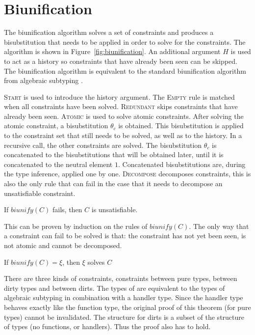 \section{Biunification}
The biunification algorithm solves a set of constraints and produces a bisubstitution that needs to be applied in order to solve for the constraints. The algorithm is shown in Figure~\ref{fig:biunification}. An additional argument $H$ is used to act as a history so constraints that have already been seen can be skipped. The biunification algorithm is equivalent to the standard biunification algorithm from algebraic subtyping \cite{dolan2017algebraic}.

\textsc{Start} is used to introduce the history argument. The \textsc{Empty} rule is matched when all constraints have been solved. \textsc{Redundant} skips constraints that have already been seen. \textsc{Atomic} is used to solve atomic constraints. After solving the atomic constraint, a bisubstitution $\theta_c$ is obtained. This bisubstitution is applied to the constraint set that still needs to be solved, as well as to the history. In a recursive call, the other constraints are solved. The bisubstitution $\theta_c$ is concatenated to the bisubstitutions that will be obtained later, until it is concatenated to the neutral element $1$. Concatenated bisubstitutions are, during the type inference, applied one by one. \textsc{Decompose} decomposes constraints, this is also the only rule that can fail in the case that it needs to decompose an unsatisfiable constraint.

\begin{theorem}
\label{thm:unify:fail}
If $\mathit{biunify}(C)$ fails, then $C$ is unsatisfiable. 
\end{theorem}
This can be proven by induction on the rules of $\mathit{biunify}(C)$. The only way that a constraint can fail to be solved is that: the constraint has not yet been seen, is not atomic and cannot be decomposed. 

\begin{theorem}
\label{thm:unify:suc}
If $\mathit{biunify}(C) = \xi$, then $\xi$ solves $C$ 
\end{theorem}
There are three kinds of constraints, constraints between pure types, between dirty types and between dirts. The types of \core are equivalent to the types of algebraic subtyping in combination with a handler type. Since the handler type behaves exactly like the function type, the original proof of this theorem (for pure types) cannot be invalidated. The structure for dirts is a subset of the structure of types (no functions, or handlers). Thus the proof also has to hold.

